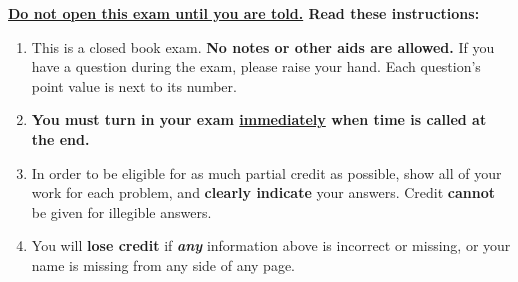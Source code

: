 \documentclass[11pt]{article}
\begin{document}

  \noindent
  {\large
    \textbf{\underline{Do not open this exam until you are told.}
            Read these instructions:
    }
  }

   \vspace{-2mm}

  \thispagestyle{myheadings}

  \begin{enumerate}

    \addtolength{\itemsep}{-2mm}  %

    \item This is a closed book exam.  {\bf No
          notes %
          or other aids are allowed.}  If you have a question during the
          exam, please raise your hand.  Each question's point value is next
          to its number.

    \item {\bf You must turn in your exam \underline{immediately} when time is
          called at the end.}


    \item In order to be eligible for as much partial credit as possible,
          show all of your work for each problem, and \textbf{clearly
          indicate} your answers.  Credit \textbf{cannot} be given for
          illegible answers.

    \item You will \textbf{lose credit} if \emph{\textbf{any}} information
           above is incorrect or missing, or your name is missing from any
           side of any page.


\end{enumerate}
\end{document}

